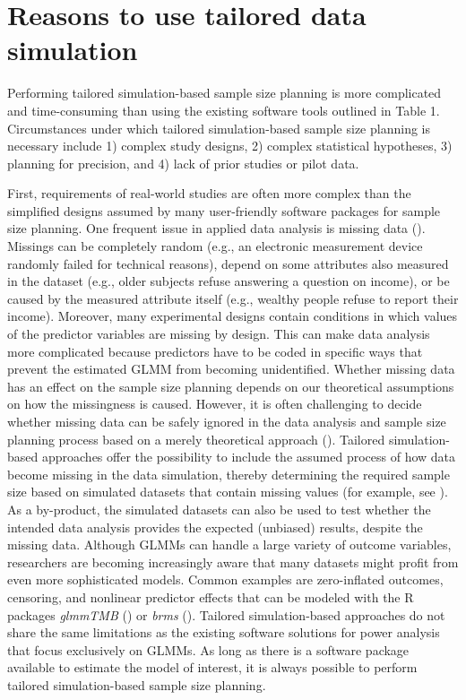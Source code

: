\documentclass[
  man,
  floatsintext,
  longtable,
  a4paper,
  nolmodern,
  notxfonts,
  notimes,
  colorlinks=true,linkcolor=blue,citecolor=blue,urlcolor=blue]{apa7}
\begin{document}
\section{Reasons to use tailored data
simulation}\label{reasons-to-use-tailored-data-simulation}

Performing tailored simulation-based sample size planning is more
complicated and time-consuming than using the existing software tools
outlined in Table 1. Circumstances under which tailored simulation-based
sample size planning is necessary include 1) complex study designs, 2)
complex statistical hypotheses, 3) planning for precision, and 4) lack
of prior studies or pilot data.

First, requirements of real-world studies are often more complex than
the simplified designs assumed by many user-friendly software packages
for sample size planning. One frequent issue in applied data analysis is
missing data (). Missings can be completely random (e.g., an electronic
measurement device randomly failed for technical reasons), depend on
some attributes also measured in the dataset (e.g., older subjects
refuse answering a question on income), or be caused by the measured
attribute itself (e.g., wealthy people refuse to report their income).
Moreover, many experimental designs contain conditions in which values
of the predictor variables are missing by design. This can make data
analysis more complicated because predictors have to be coded in
specific ways that prevent the estimated GLMM from becoming
unidentified. Whether missing data has an effect on the sample size
planning depends on our theoretical assumptions on how the missingness
is caused. However, it is often challenging to decide whether missing
data can be safely ignored in the data analysis and sample size planning
process based on a merely theoretical approach
(). Tailored simulation-based approaches offer the possibility to
include the assumed process of how data become missing in the data
simulation, thereby determining the required sample size based on
simulated datasets that contain missing values (for example, see
).
As a by-product, the simulated datasets can also be used to test whether
the intended data analysis provides the expected (unbiased) results,
despite the missing data. Although GLMMs can handle a large variety of
outcome variables, researchers are becoming increasingly aware that many
datasets might profit from even more sophisticated models. Common
examples are zero-inflated outcomes, censoring, and nonlinear predictor
effects that can be modeled with the R packages \emph{glmmTMB}
() or
\emph{brms}
().
Tailored simulation-based approaches do not share the same limitations
as the existing software solutions for power analysis that focus
exclusively on GLMMs. As long as there is a software package available
to estimate the model of interest, it is always possible to perform
tailored simulation-based sample size planning.
\end{document}

